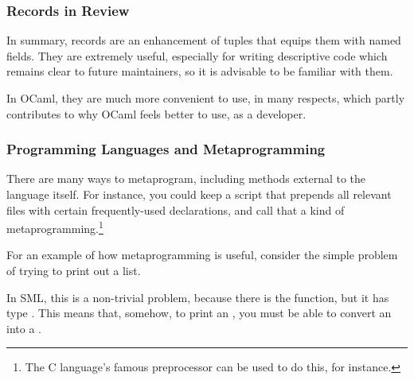 \documentclass[aspectratio=169, handout]{beamer}
\begin{document}
\begin{frame}[fragile]
  \frametitle{Records in Review}

  In summary, records are an enhancement of tuples that equips them with named
  fields. They are extremely useful, especially for writing descriptive code
  which remains clear to future maintainers, so it is advisable to be familiar
  with them.

  \vspace{\fill}

  In OCaml, they are much more convenient to use, in many respects, which
  partly contributes to why OCaml feels better to use, as a developer.
\end{frame}


\begin{frame}[fragile]
  \frametitle{Programming Languages and Metaprogramming}


  \vspace{\fill}

  There are many ways to metaprogram, including methods external to the language
  itself. For instance, you could keep a script that prepends all relevant files
  with certain frequently-used declarations, and call that a kind of
  metaprogramming.\footnote{The C language's famous preprocessor can be used to
  do this, for instance.}

  \vspace{\fill}

  For an example of how metaprogramming is useful, consider the simple problem
  of trying to print out a list.

  \vspace{\fill}

  In SML, this is a non-trivial problem, because there is the 
  function, but it has type . This means that, somehow, to
  print an , you must be able to convert an  into
  a .
\end{frame}
\end{document}
